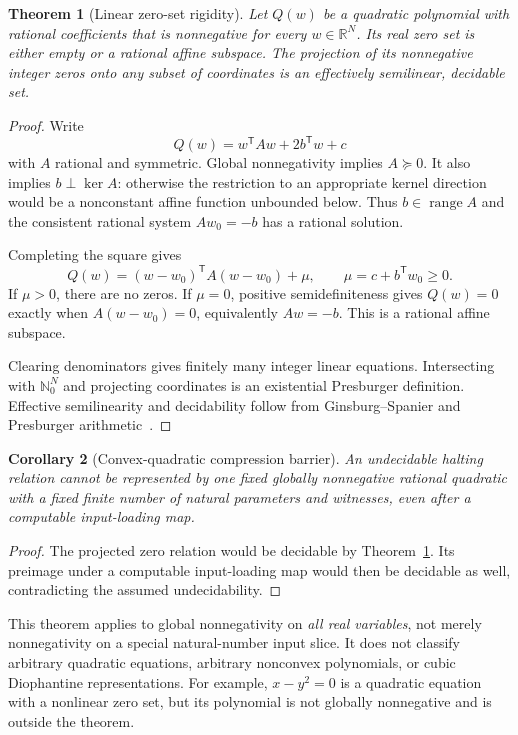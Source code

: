 \documentclass[11pt,letterpaper]{article}
\numberwithin{equation}{section}
\newtheorem{theorem}{Theorem}[section]
\newtheorem{corollary}[theorem]{Corollary}
\theoremstyle{definition}
\theoremstyle{remark}
\newcommand{\N}{\mathbb N_0}
\newcommand{\R}{\mathbb R}
\begin{document}
\begin{theorem}[Linear zero-set rigidity]
\label{smc:cg:thm:rigidity}
Let $Q(w)$ be a quadratic polynomial with rational coefficients that is
nonnegative for every $w\in\R^N$. Its real zero set is either empty or a
rational affine subspace. The projection of its nonnegative integer zeros
onto any subset of coordinates is an effectively semilinear, decidable set.
\end{theorem}
\begin{proof}
Write
\[
 Q(w)=w^{\mathsf T}Aw+2b^{\mathsf T}w+c
\]
with $A$ rational and symmetric. Global nonnegativity implies $A\succeq0$.
It also implies $b\perp\ker A$: otherwise the restriction to an appropriate
kernel direction would be a nonconstant affine function unbounded below.
Thus $b\in\operatorname{range} A$ and the consistent rational system
$Aw_0=-b$ has a rational solution.

Completing the square gives
\[
 Q(w)=(w-w_0)^{\mathsf T}A(w-w_0)+\mu,
 \qquad \mu=c+b^{\mathsf T}w_0\ge0.
\]
If $\mu>0$, there are no zeros. If $\mu=0$, positive semidefiniteness gives
$Q(w)=0$ exactly when $A(w-w_0)=0$, equivalently $Aw=-b$. This is a rational
affine subspace.

Clearing denominators gives finitely many integer linear equations.
Intersecting with $\N^N$ and projecting coordinates is an existential
Presburger definition. Effective semilinearity and decidability follow from
Ginsburg--Spanier and Presburger arithmetic~\cite{ginsburgspanier}.
\end{proof}

\begin{corollary}[Convex-quadratic compression barrier]
\label{smc:cg:cor:barrier}
An undecidable halting relation cannot be represented by one fixed globally
nonnegative rational quadratic with a fixed finite number of natural
parameters and witnesses, even after a computable input-loading map.
\end{corollary}
\begin{proof}
The projected zero relation would be decidable by
Theorem~\ref{smc:cg:thm:rigidity}. Its preimage under a computable input-loading map
would then be decidable as well, contradicting the assumed undecidability.
\end{proof}

This theorem applies to global nonnegativity on \emph{all real variables},
not merely nonnegativity on a special natural-number input slice. It does
not classify arbitrary quadratic equations, arbitrary nonconvex
polynomials, or cubic Diophantine representations. For example,
$x-y^2=0$ is a quadratic equation with a nonlinear zero set, but its
polynomial is not globally nonnegative and is outside the theorem.
\end{document}
